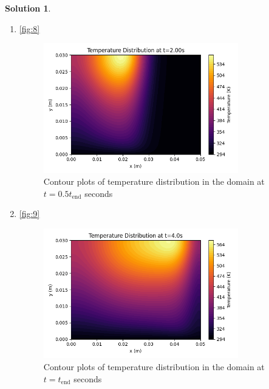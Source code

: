 \documentclass[12pt]{article}
\theoremstyle{definition} %
\newtheorem{solution}{Solution}
\theoremstyle{plain} %
\begin{document}
\begin{solution}
\begin{enumerate}
\begin{enumerate}
\begin{figure}[htbp]
            \label{fig:7}
        \end{figure}
        \item \autoref{fig:8} \begin{figure}[htbp]
            \centering
            \includegraphics[width=0.8\textwidth]{classes/TAM-470/06-10/proj-2.3.3.png}
            \caption{Contour plots of temperature distribution in the domain at $t = 0.5t_\text{end}$ seconds}
            \label{fig:8}
        \end{figure}
    \item \autoref{fig:9} \begin{figure}[htbp]
        \centering
        \includegraphics[width=0.8\textwidth]{classes/TAM-470/06-10/proj-2.3.4.png}
        \caption{Contour plots of temperature distribution in the domain at $t = t_\text{end}$ seconds}
        \label{fig:9}
    \end{figure}
        \end{enumerate}

\end{enumerate}
\end{solution}
\end{document}
